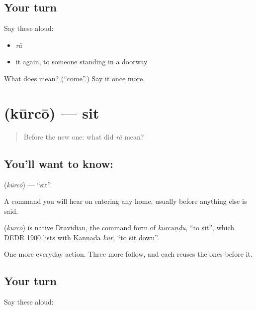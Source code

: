 \subsection*{Your turn}
Say these aloud:

\begin{itemize}
\raggedright
  \item \emph{rā}
  \item it again, to someone standing in a doorway
\end{itemize}

\begin{tcolorbox}[breakable,colback=teal!4,colframe=teal!35!black,title={Before you move on}]
What does  mean? (\textquotedblleft{}come\textquotedblright{}.) Say it once more.
\end{tcolorbox}
\section[\texorpdfstring{\te{కూర్చో} (kūrcō)}{కూర్చో (kūrcō)}]{ (kūrcō) — sit}

\label{lesson:TE-C43-sit}



\begin{quote}
Before the new one: what did \emph{rā} mean?
\end{quote}

\subsection*{You'll want to know: }
\textbf{} (\emph{kūrcō}) — \textquotedblleft{}sit\textquotedblright{}.

A command you will hear on entering any home, usually before anything else is said.

\begin{cousinweb}
\textbf{} (\emph{kūrcō}) is native Dravidian, the command form of \emph{kūrcuṇḍu}, \textquotedblleft{}to sit\textquotedblright{}, which DEDR 1900 lists with Kannada \emph{kūr}, \textquotedblleft{}to sit down\textquotedblright{}.
\end{cousinweb}

\begin{grammarlens}[title={What you've built}]
One more everyday action. Three more follow, and each reuses the ones before it.
\end{grammarlens}

\subsection*{Your turn}
Say these aloud:

